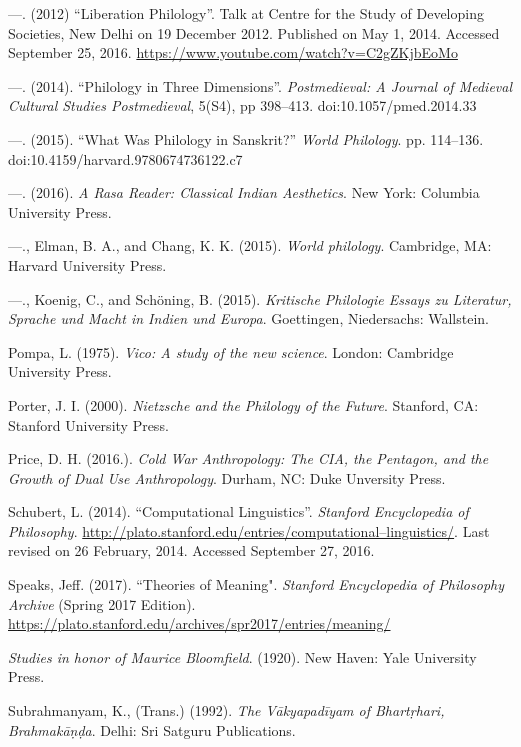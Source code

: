 \begin{thebibliography}{99}
  —. (2012) “Liberation Philology”. Talk at Centre for the Study of Developing Societies, New Delhi on 19 December 2012. Published on May 1, 2014. Accessed September 25, 2016. \url{https://www.youtube.com/watch?v=C2gZKjbEoMo}

  —. (2014). “Philology in Three Dimensions”. \textit{Postmedieval: A Journal of Medieval Cultural Studies Postmedieval}, 5(S4), pp 398–413. doi:10.1057/pmed.2014.33

  —. (2015). “What Was Philology in Sanskrit?” \textit{World Philology}. pp. 114–136. doi:10.4159/harvard.9780674736122.c7

  —. (2016). \textit{A Rasa Reader: Classical Indian Aesthetics}. New York: Columbia University Press.

  —., Elman, B. A., and Chang, K. K. (2015). \textit{World philology}. Cambridge, MA: Harvard University Press.

  —., Koenig, C., and Schöning, B. (2015). \textit{Kritische Philologie Essays zu Literatur, Sprache und Macht in Indien und Europa}. Goettingen, Niedersachs: Wallstein.

  Pompa, L. (1975). \textit{Vico: A study of the new science}. London: Cambridge University Press.

  Porter, J. I. (2000). \textit{Nietzsche and the Philology of the Future}. Stanford, CA: Stanford University Press.

  Price, D. H. (2016.). \textit{Cold War Anthropology: The CIA, the Pentagon, and the Growth of Dual Use Anthropology}. Durham, NC: Duke Unversity Press.

  Schubert, L. (2014). “Computational Linguistics”. \textit{Stanford Encyclopedia of Philosophy}. \url{http://plato.stanford.edu/entries/computational–linguistics/}. Last revised on 26 February, 2014. Accessed September 27, 2016.

  Speaks, Jeff. (2017). ``Theories of Meaning". \textit{Stanford Encyclopedia of Philosophy Archive} (Spring 2017 Edition). \url{https://plato.stanford.edu/archives/spr2017/entries/meaning/}

  \textit{Studies in honor of Maurice Bloomfield}. (1920). New Haven: Yale University Press.

  Subrahmanyam, K., (Trans.) (1992). \textit{The Vākyapadīyam of Bhartṛhari, Brahmakāṇḍa}. Delhi: Sri Satguru Publications.


\end{thebibliography}
